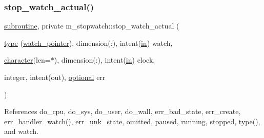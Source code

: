 \subsubsection{\texorpdfstring{stop\+\_\+watch\+\_\+actual()}{stop\_watch\_actual()}}
{\footnotesize\ttfamily \hyperlink{M__stopwatch_83_8txt_acfbcff50169d691ff02d4a123ed70482}{subroutine}, private m\+\_\+stopwatch\+::stop\+\_\+watch\+\_\+actual (\begin{DoxyParamCaption}\item[{\hyperlink{stop__watch_83_8txt_a70f0ead91c32e25323c03265aa302c1c}{type} (\hyperlink{structm__stopwatch_1_1watch__pointer}{watch\+\_\+pointer}), dimension(\+:), intent(\hyperlink{M__journal_83_8txt_afce72651d1eed785a2132bee863b2f38}{in})}]{watch,  }\item[{\hyperlink{option__stopwatch_83_8txt_abd4b21fbbd175834027b5224bfe97e66}{character}(len=$\ast$), dimension(\+:), intent(\hyperlink{M__journal_83_8txt_afce72651d1eed785a2132bee863b2f38}{in})}]{clock,  }\item[{integer, intent(out), \hyperlink{option__stopwatch_83_8txt_aa4ece75e7acf58a4843f70fe18c3ade5}{optional}}]{err }\end{DoxyParamCaption})\hspace{0.3cm}{\ttfamily [private]}}



References do\+\_\+cpu, do\+\_\+sys, do\+\_\+user, do\+\_\+wall, err\+\_\+bad\+\_\+state, err\+\_\+create, err\+\_\+handler\+\_\+watch(), err\+\_\+unk\+\_\+state, omitted, paused, running, stopped, type(), and watch.

